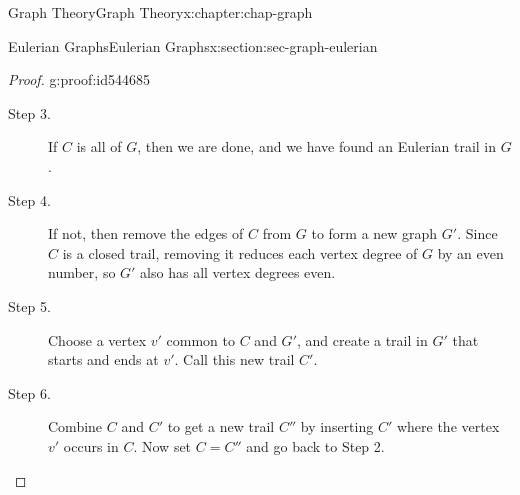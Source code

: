 \documentclass[oneside,10pt,]{book}
\numberwithin{equation}{section}
\begin{document}
\begin{chapterptx}{Graph Theory}{}{Graph Theory}{}{}{x:chapter:chap-graph}
\begin{sectionptx}{Eulerian Graphs}{}{Eulerian Graphs}{}{}{x:section:sec-graph-eulerian}
\begin{proof}{}{g:proof:id544685}
\begin{description}
\item[{Step 3.}]If \(C\) is all of \(G\), then we are done, and we have found an Eulerian trail in \(G\).%
\item[{Step 4.}]If not, then remove the edges of \(C\) from \(G\) to form a new graph \(G'\). Since \(C\) is a closed trail, removing it reduces each vertex degree of \(G\) by an even number, so \(G'\) also has all vertex degrees even.%
\item[{Step 5.}]Choose a vertex \(v'\) common to \(C\) and \(G'\), and create a trail in \(G'\) that starts and ends at \(v'\). Call this new trail \(C'\).%
\item[{Step 6.}]Combine \(C\) and \(C'\) to get a new trail \(C''\) by inserting \(C'\) where the vertex \(v'\) occurs in \(C\). Now set \(C = C''\) and go back to Step 2.%
\end{description}
%
\begin{sidebyside}{3}{0.0466666666666667}{0.0466666666666667}{0.0933333333333333}%
\begin{sbspanel}{0.24}%
\end{sbspanel}
\end{sidebyside}
\end{proof}
\end{sectionptx}
\end{chapterptx}
\end{document}
